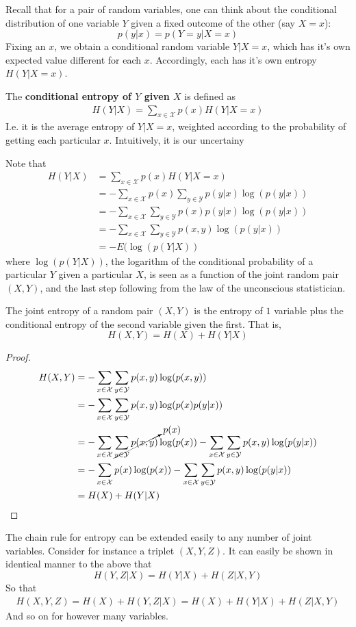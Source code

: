 Recall that for a pair of random variables, one can think about the conditional distribution of one variable $Y$ given a fixed outcome of the other (say $X = x$):
\[ p(y|x) = p(Y = y|X = x) \]
Fixing an $x$, we obtain a conditional random variable $Y|X=x$, which has it's own expected value different for each $x$. Accordingly, each has it's own entropy $H(Y|X=x)$. 
\begin{definition}
	The \textbf{conditional entropy of $Y$ given $X$} is defined as 
	\begin{align}
		H(Y|X) = \sum_{x \in \mathcal{X}} p(x)H(Y|X=x) 
	\end{align}
I.e. it is the average entropy of $Y|X=x$, weighted according to the probability of getting each particular $x$. Intuitively, it is our uncertainy 
\end{definition}
Note that 
\begin{align}
	H(Y|X) &= \sum_{x \in \mathcal{X}} p(x)H(Y|X=x) \\	
			&= -\sum_{x \in \mathcal{X}} p(x)\sum_{y \in \mathcal{Y}} p(y|x)\log(p(y|x)) \\
			&= -\sum_{x \in \mathcal{X}} \sum_{y \in \mathcal{Y}} p(x)p(y|x) \log(p(y|x)) \\
			&= -\sum_{x \in \mathcal{X}}\sum_{y \in \mathcal{Y}} p(x,y)\log(p(y|x)) \\ 
			&= -E(\log(p(Y|X)) 
\end{align}
where $\log(p(Y|X))$, the logarithm of the conditional probability of a particular $Y$ given a particular $X$, is seen as a function of the joint random pair $(X,Y)$, and the last step following from the law of the unconscious statistician.
\begin{theorem}
	The joint entropy of a random pair $(X,Y)$ is the entropy of $1$ variable plus the conditional entropy of the second variable given the first. That is,  \[H(X,Y) = H(X) + H(Y|X) \]
\end{theorem}
\begin{proof}
	\begin{align}
		H(X,Y) &= -\sum_{x \in \mathcal{X}} \sum_{y \in \mathcal{Y}} p(x,y)\log(p(x,y)) \\
			&= -\sum_{x \in \mathcal{X}} \sum_{y \in \mathcal{Y}} p(x,y)\log(p(x)p(y|x)) \\
			&= -\sum_{x \in \mathcal{X}} \cancelto{p(x)}{\sum_{y \in \mathcal{Y}} p(x,y)}\log(p(x)) -\sum_{x \in \mathcal{X}} \sum_{y \in \mathcal{Y}} p(x,y)\log(p(y|x)) \\ 
		 	&= -\sum_{x \in \mathcal{X}} p(x)\log(p(x)) - \sum_{x \in \mathcal{X}} \sum_{y \in \mathcal{Y}} p(x,y)\log(p(y|x)) \\ 
		 	&= H(X) + H(Y|X)
	\end{align}
\end{proof}
The chain rule for entropy can be extended easily to any number of joint variables. Consider for instance a triplet $(X,Y,Z)$. It can easily be shown in identical manner to the above that
\[ H(Y,Z|X) = H(Y|X) + H(Z|X,Y) \]
So that
\begin{align} 
	H(X,Y,Z) = H(X) + H(Y,Z|X) = H(X) + H(Y|X) + H(Z|X,Y)
\end{align}
And so on for however many variables. 
